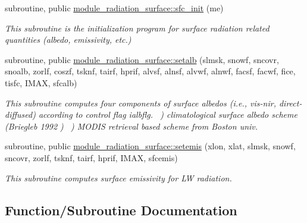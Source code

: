 \begin{DoxyCompactItemize}
\item 
subroutine, public \hyperlink{group__module__radiation__surface_gac05a5b8f903ace95e45c1cce612ed721}{module\+\_\+radiation\+\_\+surface\+::sfc\+\_\+init} (me)
\begin{DoxyCompactList}\small\item\em This subroutine is the initialization program for surface radiation related quantities (albedo, emissivity, etc.) \end{DoxyCompactList}\item 
subroutine, public \hyperlink{group__module__radiation__surface_ga3e3bd6550a924c538c88169c7c169a5b}{module\+\_\+radiation\+\_\+surface\+::setalb} (slmsk, snowf, sncovr, snoalb, zorlf, coszf, tsknf, tairf, hprif, alvsf, alnsf, alvwf, alnwf, facsf, facwf, fice, tisfc, I\+M\+AX, sfcalb)
\begin{DoxyCompactList}\small\item\em This subroutine computes four components of surface albedos (i.\+e., vis-\/nir, direct-\/diffused) according to control flag ialbflg. ~) climatological surface albedo scheme (Briegleb 1992 \cite{briegleb_1992}) ~) M\+O\+D\+IS retrieval based scheme from Boston univ. \end{DoxyCompactList}\item 
subroutine, public \hyperlink{group__module__radiation__surface_ga57ea2aa09c4194e14f2c538ef7fad7b3}{module\+\_\+radiation\+\_\+surface\+::setemis} (xlon, xlat, slmsk, snowf, sncovr, zorlf, tsknf, tairf, hprif, I\+M\+AX, sfcemis)
\begin{DoxyCompactList}\small\item\em This subroutine computes surface emissivity for LW radiation. \end{DoxyCompactList}\end{DoxyCompactItemize}


\subsection{Function/\+Subroutine Documentation}
\mbox{\label{group__module__radiation__surface_ga3e3bd6550a924c538c88169c7c169a5b}} 
